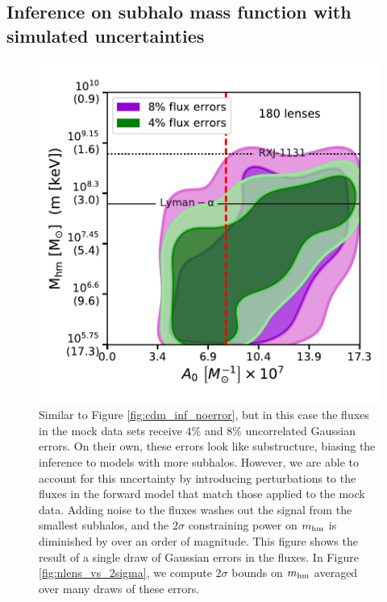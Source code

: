 \subsection{Inference on subhalo mass function with simulated uncertainties}
\label{ssec:real_inf}

\begin{figure}
	\centering
	\includegraphics[clip,trim=0cm .5cm .3cm
	.5cm,width=.75\textwidth,keepaspectratio]{./figures_ABCforward/joint_180_4_8_errors.pdf}
	\caption{\label{fig:cdm_inf_error} Similar to Figure \ref{fig:cdm_inf_noerror}, but in this case the fluxes in the mock data sets receive $4\%$ and $8\%$ uncorrelated Gaussian errors. On their own, these errors look like substructure, biasing the inference to models with more subhalos. However, we are able to account for this uncertainty by introducing perturbations to the fluxes in the forward model that match those applied to the mock data. Adding noise to the fluxes washes out the signal from the smallest subhalos, and the $2\sigma$ constraining power on $m_{\rm{hm}}$ is diminished by over an order of magnitude. This figure shows the result of a single draw of Gaussian errors in the fluxes. In Figure \ref{fig:nlens_vs_2sigma}, we compute $2\sigma$ bounds on $m_{\rm{hm}}$ averaged over many draws of these errors.}
\end{figure}

